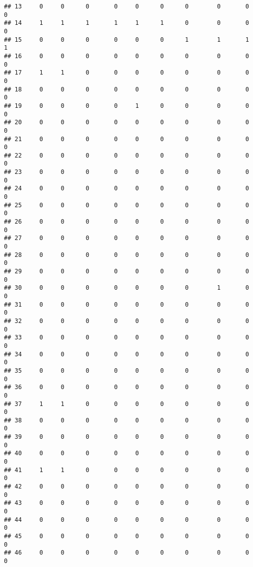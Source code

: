 \documentclass[
]{article}
\begin{document}
\begin{verbatim}
## 13     0     0      0       0     0      0      0        0       0      0
## 14     1     1      1       1     1      1      0        0       0      0
## 15     0     0      0       0     0      0      1        1       1      1
## 16     0     0      0       0     0      0      0        0       0      0
## 17     1     1      0       0     0      0      0        0       0      0
## 18     0     0      0       0     0      0      0        0       0      0
## 19     0     0      0       0     1      0      0        0       0      0
## 20     0     0      0       0     0      0      0        0       0      0
## 21     0     0      0       0     0      0      0        0       0      0
## 22     0     0      0       0     0      0      0        0       0      0
## 23     0     0      0       0     0      0      0        0       0      0
## 24     0     0      0       0     0      0      0        0       0      0
## 25     0     0      0       0     0      0      0        0       0      0
## 26     0     0      0       0     0      0      0        0       0      0
## 27     0     0      0       0     0      0      0        0       0      0
## 28     0     0      0       0     0      0      0        0       0      0
## 29     0     0      0       0     0      0      0        0       0      0
## 30     0     0      0       0     0      0      0        1       0      0
## 31     0     0      0       0     0      0      0        0       0      0
## 32     0     0      0       0     0      0      0        0       0      0
## 33     0     0      0       0     0      0      0        0       0      0
## 34     0     0      0       0     0      0      0        0       0      0
## 35     0     0      0       0     0      0      0        0       0      0
## 36     0     0      0       0     0      0      0        0       0      0
## 37     1     1      0       0     0      0      0        0       0      0
## 38     0     0      0       0     0      0      0        0       0      0
## 39     0     0      0       0     0      0      0        0       0      0
## 40     0     0      0       0     0      0      0        0       0      0
## 41     1     1      0       0     0      0      0        0       0      0
## 42     0     0      0       0     0      0      0        0       0      0
## 43     0     0      0       0     0      0      0        0       0      0
## 44     0     0      0       0     0      0      0        0       0      0
## 45     0     0      0       0     0      0      0        0       0      0
## 46     0     0      0       0     0      0      0        0       0      0

\end{verbatim}
\end{document}
